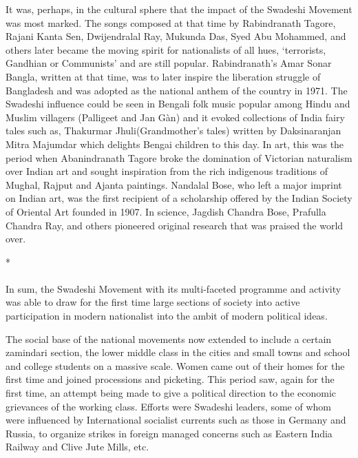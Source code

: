 It was, perhaps, in the cultural sphere that the impact of the Swadeshi Movement was most marked. The songs composed at that time by Rabindranath Tagore, Rajani Kanta Sen, Dwijendralal Ray, Mukunda Das, Syed Abu Mohammed, and others later became the moving spirit for nationalists of all hues, `terrorists, Gandhian or Communists' and are still popular. Rabindranath's Amar Sonar Bangla, written at that time, was to later inspire the liberation struggle of Bangladesh and was adopted as the national anthem of the country in 1971. The Swadeshi influence could be seen in Bengali folk music popular among Hindu and Muslim villagers (Palligeet and Jan Gàn) and it evoked collections of India fairy tales such as, Thakurmar Jhuli(Grandmother's tales) written by Daksinaranjan Mitra Majumdar which delights Bengai children to this day. In art, this was the period when Abanindranath Tagore broke the domination of Victorian naturalism over Indian art and sought inspiration from the rich indigenous traditions of Mughal, Rajput and Ajanta paintings. Nandalal Bose, who left a major imprint on Indian art, was the first recipient of a scholarship offered by the Indian Society of Oriental Art founded in 1907. In science, Jagdish Chandra Bose, Prafulla Chandra Ray, and others pioneered original research that was praised the world over.

\begin{center}*\end{center}

\paragraph*{}

In sum, the Swadeshi Movement with its multi-faceted programme and activity was able to draw for the first time large sections of society into active participation in modern nationalist into the ambit of modern political ideas.

The social base of the national movements now extended to include a certain zamindari section, the lower middle class in the cities and small towns and school and college students on a massive scale. Women came out of their homes for the first time and joined processions and picketing. This period saw, again for the first time, an attempt being made to give a political direction to the economic grievances of the working class. Efforts were Swadeshi leaders, some of whom were influenced by International socialist currents such as those in Germany and Russia, to organize strikes in foreign managed concerns such as Eastern India Railway and Clive Jute Mills, etc.

